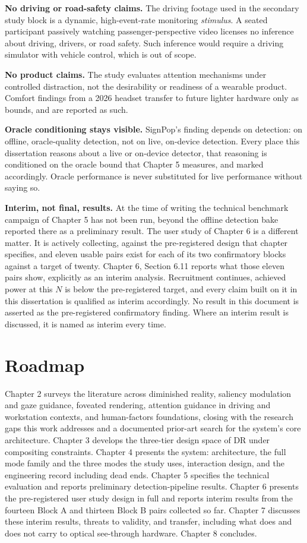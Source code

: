 \textbf{No driving or road-safety claims.} The driving footage used in the secondary study block is a
dynamic, high-event-rate monitoring \textit{stimulus}. A seated participant passively watching
passenger-perspective video licenses no inference about driving, drivers, or road safety. Such
inference would require a driving simulator with vehicle control, which is out of scope.

\textbf{No product claims.} The study evaluates attention mechanisms under controlled distraction, not the
desirability or readiness of a wearable product. Comfort findings from a 2026 headset transfer to
future lighter hardware only as bounds, and are reported as such.

\textbf{Oracle conditioning stays visible.} SignPop's finding depends on detection: on offline,
oracle-quality detection, not on live, on-device detection. Every place this dissertation reasons
about a live or on-device detector, that reasoning is conditioned on the oracle bound that Chapter 5
measures, and marked accordingly. Oracle performance is never substituted for live performance
without saying so.

\textbf{Interim, not final, results.} At the time of writing the technical benchmark campaign of
Chapter 5 has not been run, beyond the offline detection bake reported there as a preliminary result.
The user study of Chapter 6 is a different matter. It is actively collecting, against the
pre-registered design that chapter specifies, and eleven usable pairs exist for each of its two
confirmatory blocks against a target of twenty. Chapter 6, Section 6.11 reports what those eleven
pairs show, explicitly as an interim analysis. Recruitment continues, achieved power at this $N$ is
below the pre-registered target, and every claim built on it in this dissertation is qualified as
interim accordingly. No result in this document is asserted as the pre-registered confirmatory
finding. Where an interim result is discussed, it is named as interim every time.

\section{Roadmap}

Chapter 2 surveys the literature across diminished reality, saliency modulation and gaze guidance,
foveated rendering, attention guidance in driving and workstation contexts, and human-factors
foundations, closing with the research gaps this work addresses and a documented prior-art search for
the system's core architecture. Chapter 3 develops the three-tier design space of DR under
compositing constraints. Chapter 4 presents the system: architecture, the full mode family and the
three modes the study uses, interaction design, and the engineering record including dead ends. Chapter 5 specifies the technical evaluation
and reports preliminary detection-pipeline results. Chapter 6 presents the pre-registered user study
design in full and reports interim results from the fourteen Block A and thirteen Block B pairs
collected so far.
Chapter 7 discusses these interim results, threats to validity, and transfer, including what does
and does not carry to optical see-through hardware. Chapter 8 concludes.

